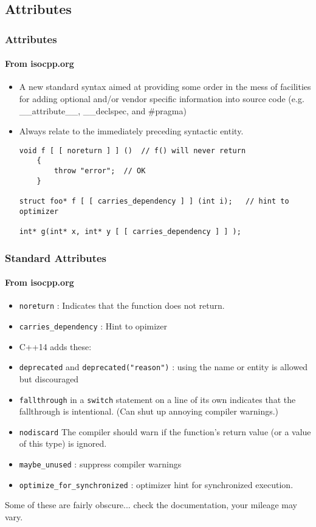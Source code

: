 \subsection{Attributes}
\begin{frame}[fragile,t]
\frametitle{Attributes}
\framesubtitle{From isocpp.org}
\begin{itemize}[<+->]
\item A new standard syntax aimed at providing some order in the mess
  of facilities for adding optional and/or vendor specific information
  into source code (e.g. \_\_attribute\_\_, \_\_declspec, and \#pragma)
\item Always relate to the immediately preceding syntactic entity.
{\scriptsize\begin{verbatim}
void f [ [ noreturn ] ] ()  // f() will never return
    {
        throw "error";  // OK
    }

struct foo* f [ [ carries_dependency ] ] (int i);   // hint to optimizer

int* g(int* x, int* y [ [ carries_dependency ] ] );
\end{verbatim}
}
\end{itemize}
\end{frame}

\begin{frame}[fragile,t]
\frametitle{Standard Attributes}
\framesubtitle{From isocpp.org}
\begin{itemize}[<+->]
  \item \texttt{noreturn} : Indicates that the function does not return.
  \item \texttt{carries\_dependency} : Hint to opimizer
  \item C++14 adds these:
  \item \texttt{deprecated} and \texttt{deprecated("reason")} : using the name
    or entity is allowed but discouraged
  \item \texttt{fallthrough} in a \texttt{switch} statement on a line of
    its own indicates that the fallthrough is intentional. (Can shut
    up annoying compiler warnings.)
  \item \texttt{nodiscard} The compiler should warn if the function's
    return value (or a value of this type) is ignored.
  \item \texttt{maybe\_unused} : suppress compiler warnings
  \item \texttt{optimize\_for\_synchronized} : optimizer hint for
    synchronized execution.
\end{itemize}
\pause
Some of these are fairly obscure... check the documentation, your
mileage may vary.

\end{frame}

